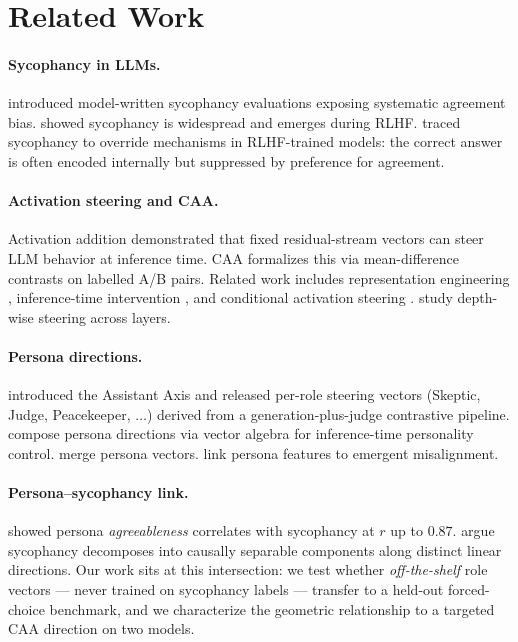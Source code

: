 \documentclass{article}
\theoremstyle{plain}
\theoremstyle{definition}
\theoremstyle{remark}
\begin{document}
\section{Related Work}

\paragraph{Sycophancy in LLMs.}
\citet{perez2022} introduced model-written sycophancy evaluations exposing systematic agreement bias. \citet{sharma2023} showed sycophancy is widespread and emerges during RLHF. \citet{wang2025a} traced sycophancy to override mechanisms in RLHF-trained models: the correct answer is often encoded internally but suppressed by preference for agreement.

\paragraph{Activation steering and CAA.}
Activation addition \cite{turner2023} demonstrated that fixed residual-stream vectors can steer LLM behavior at inference time. CAA \cite{rimsky2024} formalizes this via mean-difference contrasts on labelled A/B pairs. Related work includes representation engineering \cite{zou2023}, inference-time intervention \cite{li2023}, and conditional activation steering \cite{lee2025}. \citet{goral2025} study depth-wise steering across layers.

\paragraph{Persona directions.}
\citet{lu2026} introduced the Assistant Axis and released per-role steering vectors (Skeptic, Judge, Peacekeeper, $\ldots$) derived from a generation-plus-judge contrastive pipeline. \citet{feng2026} compose persona directions via vector algebra for inference-time personality control. \citet{pai2025} merge persona vectors. \citet{wang2025b} link persona features to emergent misalignment.

\paragraph{Persona--sycophancy link.}
\citet{shah2026} showed persona \emph{agreeableness} correlates with sycophancy at $r$ up to $0.87$. \citet{vennemeyer2025} argue sycophancy decomposes into causally separable components along distinct linear directions. Our work sits at this intersection: we test whether \emph{off-the-shelf} role vectors --- never trained on sycophancy labels --- transfer to a held-out forced-choice benchmark, and we characterize the geometric relationship to a targeted CAA direction on two models.
\end{document}
